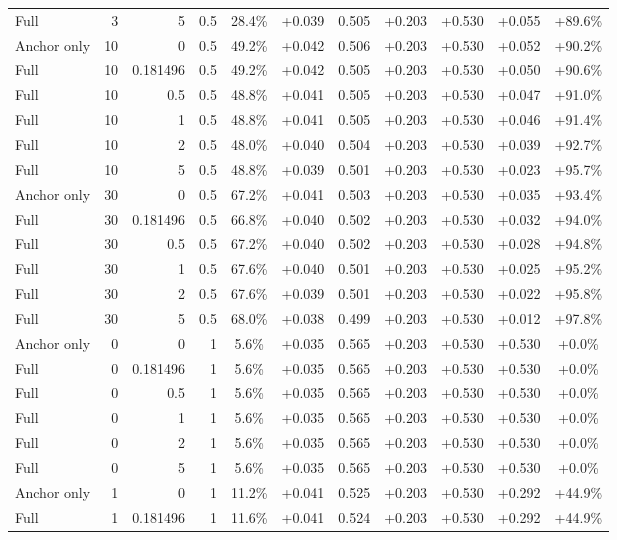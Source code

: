 \begin{table}[htbp]
\begin{tabular}{lrrrccccccc}
Full & 3 & 5 & 0.5 & 28.4\% & +0.039 & 0.505 & +0.203 & +0.530 & +0.055 & +89.6\% \\
Anchor only & 10 & 0 & 0.5 & 49.2\% & +0.042 & 0.506 & +0.203 & +0.530 & +0.052 & +90.2\% \\
Full & 10 & 0.181496 & 0.5 & 49.2\% & +0.042 & 0.505 & +0.203 & +0.530 & +0.050 & +90.6\% \\
Full & 10 & 0.5 & 0.5 & 48.8\% & +0.041 & 0.505 & +0.203 & +0.530 & +0.047 & +91.0\% \\
Full & 10 & 1 & 0.5 & 48.8\% & +0.041 & 0.505 & +0.203 & +0.530 & +0.046 & +91.4\% \\
Full & 10 & 2 & 0.5 & 48.0\% & +0.040 & 0.504 & +0.203 & +0.530 & +0.039 & +92.7\% \\
Full & 10 & 5 & 0.5 & 48.8\% & +0.039 & 0.501 & +0.203 & +0.530 & +0.023 & +95.7\% \\
Anchor only & 30 & 0 & 0.5 & 67.2\% & +0.041 & 0.503 & +0.203 & +0.530 & +0.035 & +93.4\% \\
Full & 30 & 0.181496 & 0.5 & 66.8\% & +0.040 & 0.502 & +0.203 & +0.530 & +0.032 & +94.0\% \\
Full & 30 & 0.5 & 0.5 & 67.2\% & +0.040 & 0.502 & +0.203 & +0.530 & +0.028 & +94.8\% \\
Full & 30 & 1 & 0.5 & 67.6\% & +0.040 & 0.501 & +0.203 & +0.530 & +0.025 & +95.2\% \\
Full & 30 & 2 & 0.5 & 67.6\% & +0.039 & 0.501 & +0.203 & +0.530 & +0.022 & +95.8\% \\
Full & 30 & 5 & 0.5 & 68.0\% & +0.038 & 0.499 & +0.203 & +0.530 & +0.012 & +97.8\% \\
Anchor only & 0 & 0 & 1 & 5.6\% & +0.035 & 0.565 & +0.203 & +0.530 & +0.530 & +0.0\% \\
Full & 0 & 0.181496 & 1 & 5.6\% & +0.035 & 0.565 & +0.203 & +0.530 & +0.530 & +0.0\% \\
Full & 0 & 0.5 & 1 & 5.6\% & +0.035 & 0.565 & +0.203 & +0.530 & +0.530 & +0.0\% \\
Full & 0 & 1 & 1 & 5.6\% & +0.035 & 0.565 & +0.203 & +0.530 & +0.530 & +0.0\% \\
Full & 0 & 2 & 1 & 5.6\% & +0.035 & 0.565 & +0.203 & +0.530 & +0.530 & +0.0\% \\
Full & 0 & 5 & 1 & 5.6\% & +0.035 & 0.565 & +0.203 & +0.530 & +0.530 & +0.0\% \\
Anchor only & 1 & 0 & 1 & 11.2\% & +0.041 & 0.525 & +0.203 & +0.530 & +0.292 & +44.9\% \\
Full & 1 & 0.181496 & 1 & 11.6\% & +0.041 & 0.524 & +0.203 & +0.530 & +0.292 & +44.9\% \\

\end{tabular}
\end{table}
